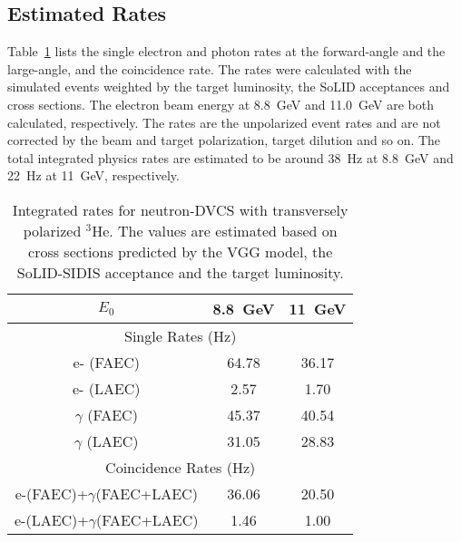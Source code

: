 \subsection{Estimated Rates}
Table~\ref{rate_table} lists the single electron and photon rates at the forward-angle and the large-angle, and the coincidence rate. The rates were calculated with the simulated events weighted by the target luminosity, the SoLID acceptances and cross sections. The electron beam energy at 8.8~GeV and 11.0~GeV are both calculated, respectively. The rates are the unpolarized event rates and are not corrected by the beam and target polarization, target dilution and so on. The total integrated physics rates are estimated to be around 38~Hz at 8.8~GeV and 22~Hz at 11~GeV, respectively. 
\begin{table}[!ht]
\centering
\begin{tabular}{|c|c|c|}
 \hline
  $E_{0}$              &    8.8~GeV & 11~GeV\\
 \hline
                  \multicolumn{3}{|c|}{Single Rates (Hz)}     \\
 \hline
 e- (FAEC)      &  64.78 &36.17   \\
 e- (LAEC)      &  2.57 &1.70   \\
 $\gamma$ (FAEC)&  45.37 &40.54    \\
 $\gamma$ (LAEC)&  31.05 &28.83    \\
 \hline
                  \multicolumn{3}{|c|}{Coincidence Rates (Hz)}                                     \\
 \hline
e-(FAEC)+$\gamma$(FAEC+LAEC) & 36.06  & 20.50   \\
e-(LAEC)+$\gamma$(FAEC+LAEC) &  1.46  &  1.00   \\
 \hline
\end{tabular}
\caption[Integrated rates for neutron-DVCS with transversely polarized $\mathrm{^{3}He}$]{\footnotesize{Integrated rates for neutron-DVCS with transversely polarized $\mathrm{^{3}He}$. The values are estimated based on cross sections predicted by the VGG model, the SoLID-SIDIS acceptance and the target luminosity.}}
\label{rate_table}
\end{table} 

